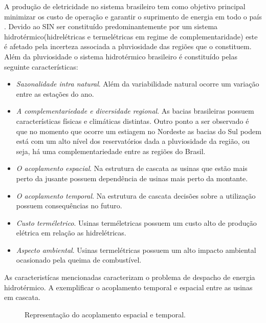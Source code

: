 A produ\c c\~ao de eletricidade no sistema brasileiro tem como objetivo principal minimizar
os custo de opera\c c\~ao e garantir o suprimento de energia em todo o pa\'is \cite{tom}. Devido ao SIN ser
constitu\'ido predominantemente por um sistema hidrot\'ermico(hidrel\'etricas e termel\'etricas em regime de
complementaridade) este \'e afetado pela incerteza associada a pluviosidade
das regi\~oes que o constituem\cite{an}. Al\'em da pluviosidade o sistema hidrot\'ermico brasileiro \'e constitu\'ido
pelas seguinte caracter\'isticas:
\begin{itemize}
	\item \textit{Sazonalidade intra natural}. Al\'em da variabilidade natural ocorre um varia\c c\~ao entre as esta\c
		c\~oes do ano. 
	\item \textit{A complementariedade e diversidade regional}. As bacias brasileiras possuem caracter\'isticas
		f\'isicas e clim\'aticas distintas. Outro ponto a ser observado \'e que no momento que ocorre um estiagem no
		Nordeste as bacias do Sul podem est\'a com um alto n\'ivel dos reservat\'orios dada a pluviosidade da regi\~ao,
		ou seja, h\'a uma complementariedade entre as regi\~oes do Brasil.
	\item \textit{O acoplamento espacial}. Na estrutura de cascata as usinas que est\~ao mais perto da jusante possuem depend\^encia
		de usinas mais perto da montante.
	\item \textit{O acoplamento temporal}. Na estrutura de cascata decis\~oes sobre a utiliza\c c\~ao possuem
		consequ\^encias no futuro. 
	\item \textit{Custo term\'eletrico}. Usinas term\'eletricas possuem um custo alto de produ\c c\~ao el\'etrica em
		rela\c c\~ao as hidrel\'etricas.
	\item \textit{Aspecto ambiental}. Usinas termel\'etricas possuem um alto impacto ambiental ocasionado pela queima de
		combust\'ivel.
\end{itemize}

As caracterist\'icas mencionadas caracterizam o problema de despacho de energia hidrot\'ermico. A   exemplificar
o acoplamento temporal e espacial entre as usinas em cascata.
\begin{figure}[!htpb]
  \centering
  \resizebox{0.6\textwidth}{!}{%
  }
  \caption{Representa\c c\~ao do acoplamento espacial e temporal.}
  \label{st}
\end{figure}

